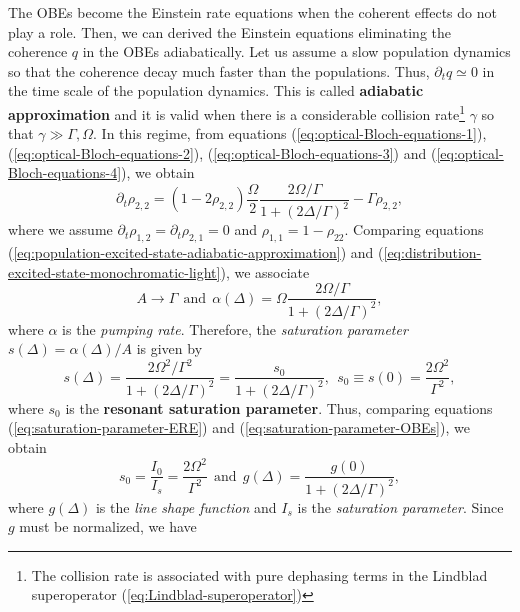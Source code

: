 {The OBEs become the Einstein rate equations when the coherent effects do not play a role. Then, we can derived the Einstein equations eliminating the coherence $ q $ in the OBEs adiabatically. Let us assume a slow population dynamics so that the coherence decay much faster than the populations. Thus, $ \partial_t q \simeq 0 $ in the time scale of the population dynamics. This is called \textbf{adiabatic approximation} and it is valid when there is a considerable collision rate\footnote{The collision rate is associated with pure dephasing terms in the Lindblad superoperator (\ref{eq:Lindblad-superoperator})} $ \gamma $ so that $ \gamma \gg \Gamma, \Omega $. In this regime, from equations (\ref{eq:optical-Bloch-equations-1}), (\ref{eq:optical-Bloch-equations-2}), (\ref{eq:optical-Bloch-equations-3}) and (\ref{eq:optical-Bloch-equations-4}), we obtain
\begin{equation}
	\partial_t \rho_{2,2} = (1 - 2\rho_{2,2})\frac{\Omega}{2}\frac{2\Omega / \Gamma}{1 + (2\Delta / \Gamma)^2} - \Gamma \rho_{2,2},
	\label{eq:population-excited-state-adiabatic-approximation}
\end{equation}
where we assume $ \partial_t \rho_{1,2} = \partial_t \rho_{2,1} = 0 $ and $ \rho_{1,1} = 1 - \rho_{22} $. Comparing equations (\ref{eq:population-excited-state-adiabatic-approximation}) and (\ref{eq:distribution-excited-state-monochromatic-light}), we associate
\begin{equation}
	A \rightarrow \Gamma \ \ \textrm{and}\ \ \alpha(\Delta) = \Omega\frac{2\Omega / \Gamma}{1 + (2\Delta / \Gamma)^2},
\end{equation}
where $ \alpha $ is the \textit{pumping rate}. Therefore, the \textit{saturation parameter} $ s(\Delta) = \alpha(\Delta) / A $ is given by
\begin{equation}
	s(\Delta) = \frac{2\Omega^2 / \Gamma^2}{1 + (2\Delta / \Gamma)^2} = \frac{s_0}{1 + (2\Delta/\Gamma)^2},\ \ s_0 \equiv s(0) = \frac{2\Omega^2}{\Gamma^2},
	\label{eq:saturation-parameter-OBEs}
\end{equation}
where $ s_0 $ is the \textbf{resonant saturation parameter}. Thus, comparing equations (\ref{eq:saturation-parameter-ERE}) and (\ref{eq:saturation-parameter-OBEs}), we obtain
\begin{equation}
	s_0 = \frac{I_0}{I_s} = \frac{2\Omega^2}{\Gamma^2}\ \ \textrm{and}\ \ g(\Delta) = \frac{g(0)}{1 + (2\Delta/\Gamma)^2},
\end{equation}
where $ g(\Delta) $ is the \textit{line shape function} and $ I_s $ is the \textit{saturation parameter}. Since $ g $ must be normalized, we have
}
